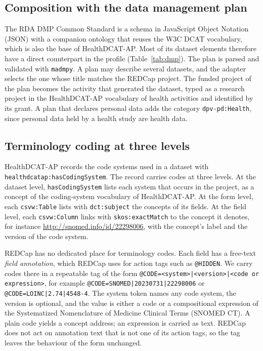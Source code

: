 \documentclass[12pt]{article}
\newcommand{\code}[1]{\texttt{#1}}
\newif\ifrevision \revisiontrue
\begin{document}
\subsection{Composition with the data management plan}

The RDA DMP Common Standard is a schema in JavaScript Object Notation (JSON) with a companion ontology that reuses
the W3C DCAT vocabulary,\citep{rdadmp,cardoso2022dcso} which is also the base of
HealthDCAT-AP. Most of its dataset elements therefore have a direct counterpart in the
profile (Table~\ref{tab:dmp}). The plan is parsed and validated with \code{madmpy}.%
\citep{madmpy} A plan may describe several datasets, and the adapter selects the one
whose title matches the REDCap project. The funded project of the plan becomes the
activity that generated the dataset, typed as a research project in the HealthDCAT-AP
vocabulary of health activities and identified by its grant. A plan that declares
personal data adds the category \code{dpv-pd:Health}, since personal data held by a
health study are health data.

\ifrevision\fi

\subsection{Terminology coding at three levels}

HealthDCAT-AP records the code systems used in a dataset with
\code{healthdcatap:hasCodingSystem}. The record carries codes at three levels. At the dataset level,
\code{hasCodingSystem} lists each system that occurs in the project, as a concept of the
coding-system vocabulary of HealthDCAT-AP. At the form level,
each \code{csvw:Table} lists with \code{dct:subject} the concepts of its fields. At the
field level, each \code{csvw:Column} links with \code{skos:exactMatch} to the concept it
denotes, for instance \url{http://snomed.info/id/22298006}, with the concept's label and
the version of the code system.

REDCap has no dedicated place for terminology codes. Each field has a free-text
\emph{field annotation}, which REDCap uses for action tags such as \code{@HIDDEN}. We
carry codes there in a repeatable tag of the form
\code{@CODE=<system>|<version>|<code or expression>}, for example
\code{@CODE=SNOMED|20230731|22298006} or \code{@CODE=LOINC|2.74|4548-4}. The system token
names any code system, the version is optional, and the value is either a code or a
compositional expression of the Systematized Nomenclature of Medicine Clinical Terms
(SNOMED CT).\citep{snomedct} A plain code yields a concept
address; an expression is carried as text. REDCap does not act on annotation text that is not one of its action tags, so
the tag leaves the behaviour of the form unchanged.
\end{document}
